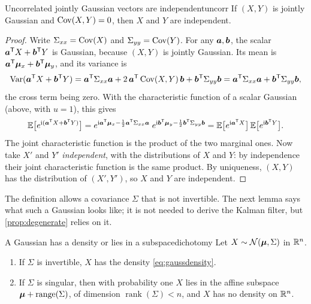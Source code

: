 \begin{lemma}{Uncorrelated jointly Gaussian vectors are independent}{uncorr}
If $(X,Y)$ is jointly Gaussian and $\operatorname{Cov}(X,Y)=0$, then $X$ and $Y$ are
independent.
\end{lemma}

\begin{proof}
Write $\Sigma_{xx}=\operatorname{Cov}(X)$ and $\Sigma_{yy}=\operatorname{Cov}(Y)$. For any $\bm{a},\bm{b}$, the scalar $\bm{a}^{\mathsf{T}} X+\bm{b}^{\mathsf{T}} Y$ is Gaussian, because $(X,Y)$ is
jointly Gaussian. Its mean is $\bm{a}^{\mathsf{T}}\bm{\mu}_x+\bm{b}^{\mathsf{T}}\bm{\mu}_y$, and its
variance is
\[
  \operatorname{Var}(\bm{a}^{\mathsf{T}} X+\bm{b}^{\mathsf{T}} Y)
  =\bm{a}^{\mathsf{T}}\Sigma_{xx}\bm{a}+2\,\bm{a}^{\mathsf{T}}\operatorname{Cov}(X,Y)\,\bm{b}
   +\bm{b}^{\mathsf{T}}\Sigma_{yy}\bm{b}
  =\bm{a}^{\mathsf{T}}\Sigma_{xx}\bm{a}+\bm{b}^{\mathsf{T}}\Sigma_{yy}\bm{b} ,
\]
the cross term being zero. With the characteristic function of a scalar
Gaussian (above, with $u=1$), this gives
\[
  \mathbb{E}\bigl[e^{\mathrm{i}(\bm{a}^{\mathsf{T}} X+\bm{b}^{\mathsf{T}} Y)}\bigr]
  =e^{\mathrm{i}\bm{a}^{\mathsf{T}}\bm{\mu}_x-\frac12\bm{a}^{\mathsf{T}}\Sigma_{xx}\bm{a}}\;
   e^{\mathrm{i}\bm{b}^{\mathsf{T}}\bm{\mu}_y-\frac12\bm{b}^{\mathsf{T}}\Sigma_{yy}\bm{b}}
  =\mathbb{E}\bigl[e^{\mathrm{i}\bm{a}^{\mathsf{T}} X}\bigr]\,\mathbb{E}\bigl[e^{\mathrm{i}\bm{b}^{\mathsf{T}} Y}\bigr].
\]
The joint characteristic function is the product of the two marginal
ones. Now take $X'$ and $Y'$ \emph{independent}, with the distributions of
$X$ and $Y$: by independence their joint characteristic function is the
same product. By uniqueness, $(X,Y)$ has the distribution of $(X',Y')$,
so $X$ and $Y$ are independent.
\end{proof}

The definition allows a covariance $\Sigma$ that is not invertible. The
next lemma says what such a Gaussian looks like; it is not needed to
derive the Kalman filter, but \cref{prop:degenerate} relies on it.

\begin{lemma}{A Gaussian has a density or lies in a subspace}{dichotomy}
Let $X\sim\mathcal{N}(\bm{\mu},\Sigma)$ in $\mathbb{R}^n$.
\begin{enumerate}[label=(\roman*),nosep]
\item If $\Sigma$ is invertible, $X$ has the density
  \eqref{eq:gaussdensity}.
\item If $\Sigma$ is singular, then with probability one $X$ lies in the
  affine subspace $\bm{\mu}+\operatorname{range}(\Sigma)$, of dimension
  $\operatorname{rank}(\Sigma)<n$, and $X$ has no density on $\mathbb{R}^n$.
\end{enumerate}
\end{lemma}

